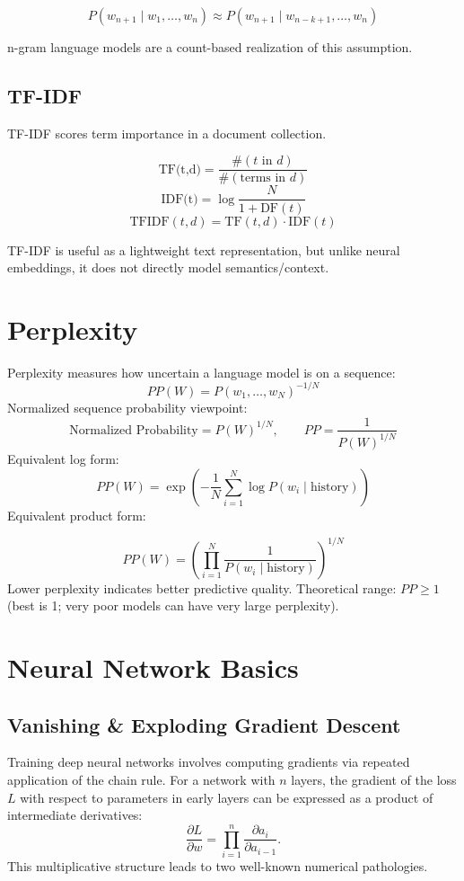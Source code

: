 \documentclass[10pt,a4paper]{article}
\begin{document}
\[
P(w_{n+1}\mid w_1,\ldots,w_n)\approx P(w_{n+1}\mid w_{n-k+1},\ldots,w_n)
\]

n-gram language models are a count-based realization of this assumption.

\subsection{TF-IDF}
TF-IDF scores term importance in a document collection.

\[
\text{TF(t,d)}=\frac{\#(t\text{ in }d)}{\#(\text{terms in }d)}
\]
\[
\text{IDF(t)}=\log\frac{N}{1+\text{DF}(t)}
\]
\[
\text{TFIDF}(t,d)=\text{TF}(t,d)\cdot \text{IDF}(t)
\]

TF-IDF is useful as a lightweight text representation, but unlike neural embeddings, it does not directly model semantics/context.

\section{Perplexity}
Perplexity measures how uncertain a language model is on a sequence:
\[
PP(W)=P(w_1,\ldots,w_N)^{-1/N}
\]
Normalized sequence probability viewpoint:
\[
\text{Normalized Probability}=P(W)^{1/N},\qquad PP=\frac{1}{P(W)^{1/N}}
\]
Equivalent log form:
\[
PP(W)=\exp\left(-\frac{1}{N}\sum_{i=1}^{N}\log P(w_i\mid \text{history})\right)
\]
Equivalent product form:

\[
PP(W)=\left(\prod_{i=1}^{N}\frac{1}{P(w_i\mid \text{history})}\right)^{1/N}
\]
Lower perplexity indicates better predictive quality. Theoretical range: $PP\ge 1$ (best is 1; very poor models can have very large perplexity).



\section{Neural Network Basics}

\subsection{Vanishing \& Exploding Gradient Descent}

Training deep neural networks involves computing gradients via repeated application of the chain rule. For a network with $n$ layers, the gradient of the loss $L$ with respect to parameters in early layers can be expressed as a product of intermediate derivatives:
\[
\frac{\partial L}{\partial w} = \prod_{i=1}^{n} \frac{\partial a_i}{\partial a_{i-1}}.
\]
This multiplicative structure leads to two well-known numerical pathologies.
\end{document}
